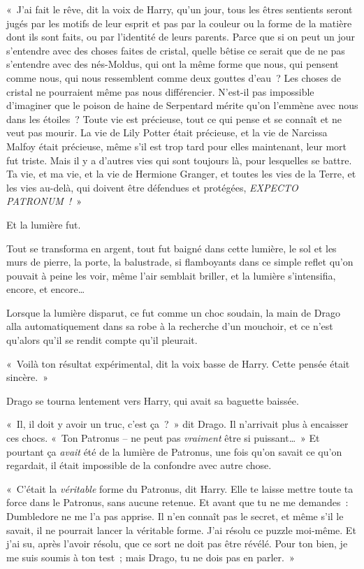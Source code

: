 «~J'ai fait le rêve, dit la voix de Harry, qu'un jour, tous les êtres sentients\footnotemark{} seront jugés par les motifs de leur esprit et pas par la couleur ou la forme de la matière dont ils sont faits, ou par l'identité de leurs parents. Parce que si on peut un jour s'entendre avec des choses faites de cristal, quelle bêtise ce serait que de ne pas s'entendre avec des nés-Moldus, qui ont la même forme que nous, qui pensent comme nous, qui nous ressemblent comme deux gouttes d'eau~? Les choses de cristal ne pourraient même pas nous différencier. N'est-il pas impossible d'imaginer que le poison de haine de Serpentard mérite qu'on l'emmène avec nous dans les étoiles~? Toute vie est précieuse, tout ce qui pense et se connaît et ne veut pas mourir. La vie de Lily Potter était précieuse, et la vie de Narcissa Malfoy était précieuse, même s'il est trop tard pour elles maintenant, leur mort fut triste. Mais il y a d'autres vies qui sont toujours là, pour lesquelles se battre. Ta vie, et ma vie, et la vie de Hermione Granger, et toutes les vies de la Terre, et les vies au-delà, qui doivent être défendues et protégées, \emph{EXPECTO PATRONUM~!}~»

Et la lumière fut.

Tout se transforma en argent, tout fut baigné dans cette lumière, le sol et les murs de pierre, la porte, la balustrade, si flamboyants dans ce simple reflet qu'on pouvait à peine les voir, même l'air semblait briller, et la lumière s'intensifia, encore, et encore…

Lorsque la lumière disparut, ce fut comme un choc soudain, la main de Drago alla automatiquement dans sa robe à la recherche d'un mouchoir, et ce n'est qu'alors qu'il se rendit compte qu'il pleurait.

«~Voilà ton résultat expérimental, dit la voix basse de Harry. Cette pensée était sincère.~»

Drago se tourna lentement vers Harry, qui avait sa baguette baissée.

«~Il, il doit y avoir un truc, c'est ça~?~» dit Drago. Il n'arrivait plus à encaisser ces chocs. «~Ton Patronus -- ne peut pas \emph{vraiment} être si puissant…~» Et pourtant ça \emph{avait} été de la lumière de Patronus, une fois qu'on savait ce qu'on regardait, il était impossible de la confondre avec autre chose.

«~C'était la \emph{véritable} forme du Patronus, dit Harry. Elle te laisse mettre toute ta force dans le Patronus, sans aucune retenue. Et avant que tu ne me demandes~: Dumbledore ne me l'a pas apprise. Il n'en connaît pas le secret, et même s'il le savait, il ne pourrait lancer la véritable forme. J'ai résolu ce puzzle moi-même. Et j'ai su, après l'avoir résolu, que ce sort ne doit pas être révélé. Pour ton bien, je me suis soumis à ton test~; mais Drago, tu ne dois pas en parler.~»

